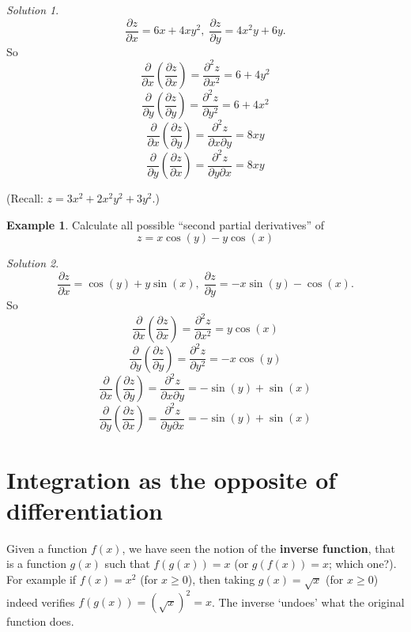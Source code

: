 \documentclass[
  english,
  11pt,
  oneside]{book}
\newcommand{\slide}{}
\theoremstyle{definition}
\theoremstyle{definition}
\newtheorem{example}{Example}[chapter]
\theoremstyle{definition}
\theoremstyle{definition}
\theoremstyle{remark}
\newtheorem*{solution}{Solution}
\begin{document}
\begin{solution}
\[\frac{\partial z}{\partial x} = 6x+4xy^2,\;\frac{\partial z}{\partial y} = 4x^2y+6y.\]
So
\[\frac{\partial}{\partial x}\left(\frac{\partial z}{\partial x}\right) = \frac{\partial^2 z}{\partial x^2} = 6+4y^2\]
\[\frac{\partial}{\partial y}\left(\frac{\partial z}{\partial y}\right) = \frac{\partial^2 z}{\partial y^2} = 6+4x^2\]
\[\frac{\partial}{\partial x}\left(\frac{\partial z}{\partial y}\right) = \frac{\partial^2 z}{\partial x\partial y} = 8xy\]
\[\frac{\partial}{\partial y}\left(\frac{\partial z}{\partial x}\right) = \frac{\partial^2 z}{\partial y\partial x} = 8xy\]
\end{solution}

\begin{slidesonly}

\slide

(Recall: \(z=3x^2+2x^2y^2+3y^2\).)
\slide

\end{slidesonly}

\begin{example}
Calculate all possible ``second partial derivatives'' of
\[z = x\cos(y)-y\cos(x)\]
\end{example}

\begin{solution}
\[\frac{\partial z}{\partial x} = \cos(y)+y\sin(x),\;\frac{\partial z}{\partial y} = -x\sin(y)-\cos(x).\]
So
\[\frac{\partial}{\partial x}\left(\frac{\partial z}{\partial x}\right) = \frac{\partial^2 z}{\partial x^2} = y\cos(x)\]
\[\frac{\partial}{\partial y}\left(\frac{\partial z}{\partial y}\right) = \frac{\partial^2 z}{\partial y^2} = -x\cos(y)\]
\[\frac{\partial}{\partial x}\left(\frac{\partial z}{\partial y}\right) = \frac{\partial^2 z}{\partial x\partial y} = -\sin(y)+\sin(x)\]
\[\frac{\partial}{\partial y}\left(\frac{\partial z}{\partial x}\right) = \frac{\partial^2 z}{\partial y\partial x} = -\sin(y)+\sin(x)\]
\end{solution}

\slide

\section{Integration as the opposite of differentiation}\label{integration-as-the-opposite-of-differentiation}

Given a function \(f(x)\), we have seen the notion of the \textbf{inverse function}, that is a function \(g(x)\) such that \(f(g(x)) = x\) (or \(g(f(x))=x\); which one?). For example if \(f(x) = x^2\) (for \(x\geq0\)), then taking \(g(x) = \sqrt{x}\) (for \(x\geq0\)) indeed verifies \(f(g(x)) = (\sqrt{x})^2 = x\). The inverse `undoes' what the original function does.
\end{document}

